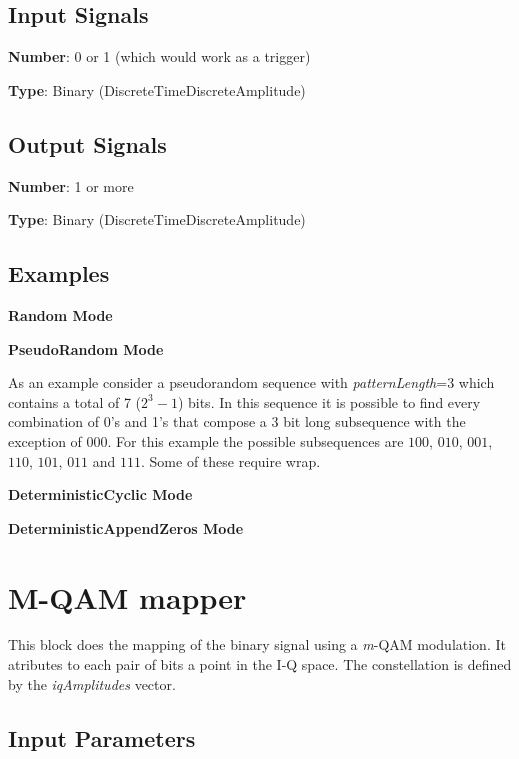 \documentclass[a4paper]{article}
\begin{document}
\subsection*{Input Signals}

\textbf{Number}: 0 or 1 (which would work as a trigger)

\textbf{Type}: Binary (DiscreteTimeDiscreteAmplitude)

\subsection*{Output Signals}

\textbf{Number}: 1 or more

\textbf{Type}: Binary (DiscreteTimeDiscreteAmplitude)

\subsection*{Examples}

\textbf{Random Mode}

\textbf{PseudoRandom Mode}

As an example consider a pseudorandom sequence with \textit{patternLength}=3 which contains a total of 7 ($2^3-1$) bits. In this sequence it is possible to find every combination of 0's and 1's that compose a 3 bit long subsequence with the exception of $000$. For this example the possible subsequences are $100$, $010$, $001$, $110$, $101$, $011$ and $111$. Some of these require wrap. 




\textbf{DeterministicCyclic Mode}

\textbf{DeterministicAppendZeros Mode}


\section*{M-QAM mapper}

This block does the mapping of the binary signal using a \textit{m}-QAM modulation. It atributes to each pair of bits a point in the I-Q space. The constellation is defined by the \textit{iqAmplitudes} vector.

\subsection*{Input Parameters}
\end{document}
